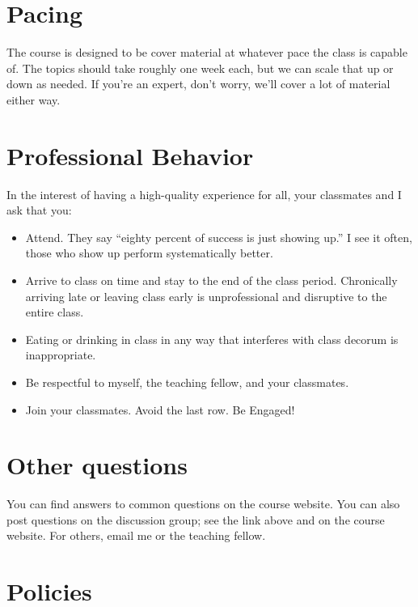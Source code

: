 \section*{Pacing}

The course is designed to be cover material at whatever pace the class is capable of.
The topics should take roughly one week each, but we can scale that up or down as needed.
If you're an expert, don't worry, we'll cover a lot of material either way.

\section*{Professional Behavior}
In the interest of having a high-quality experience for all, your classmates and I ask that you:
\begin{itemize}
\item Attend. They say ``eighty percent of success is just showing up.'' I see it often, those who show up perform systematically better.

\item Arrive to class on time and stay to the end of the class period. Chronically arriving late or leaving class early is unprofessional and disruptive to the entire class.

\item Eating or drinking in class in any way that interferes with class decorum is inappropriate.

\item Be respectful to myself, the teaching fellow, and your classmates.

\item Join your classmates. Avoid the last row. Be Engaged!
\end{itemize}


\section*{Other questions}

You can find answers to common questions on the course website. You can also post questions on the discussion group; see the link above and on the course website. For others, email me or the teaching fellow.

\section*{Policies}

